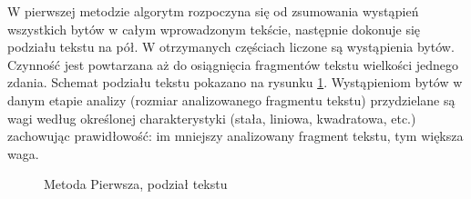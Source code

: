 \documentclass[12pt,a4paper]{article} %
\begin{document}
        W pierwszej metodzie algorytm rozpoczyna się od zsumowania wystąpień wszystkich bytów w całym wprowadzonym tekście, następnie dokonuje się podziału tekstu na pół. W otrzymanych częściach liczone są wystąpienia bytów. Czynność jest powtarzana aż do osiągnięcia fragmentów tekstu wielkości jednego zdania. Schemat podziału tekstu pokazano na rysunku \ref{fig:polowy}. Wystąpieniom bytów w danym etapie analizy (rozmiar analizowanego fragmentu tekstu) przydzielane są wagi według określonej charakterystyki (stała, liniowa, kwadratowa, etc.) zachowując prawidłowość: im mniejszy analizowany fragment tekstu, tym większa waga.
        \begin{figure}[!h]
        \caption{Metoda Pierwsza, podział tekstu}
        \label{fig:polowy}
        \centering
        \end{figure}
        
\end{document}
